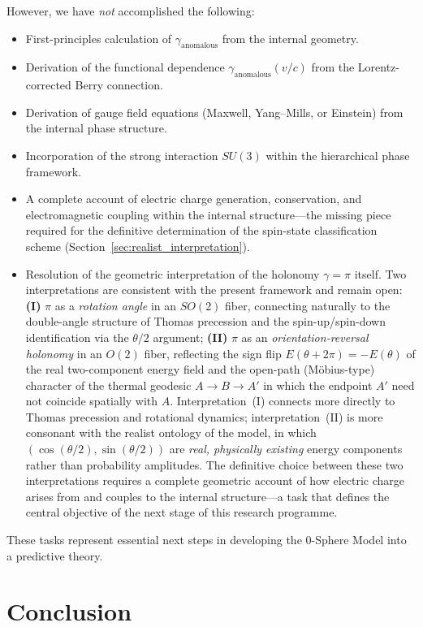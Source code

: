 \documentclass[%
 reprint,
 amsmath,amssymb,
 aps,
 prb,
]{revtex4-2}
\numberwithin{equation}{section}
\theoremstyle{definition}
\theoremstyle{remark}
\begin{document}
However, we have \emph{not} accomplished the following:
\begin{itemize}
\item First-principles calculation of $\gamma_{\text{anomalous}}$ from the internal geometry.
\item Derivation of the functional dependence $\gamma_{\text{anomalous}}(v/c)$ from the Lorentz-corrected Berry connection.
\item Derivation of gauge field equations (Maxwell, Yang--Mills, or Einstein) from the internal phase structure.
\item Incorporation of the strong interaction $SU(3)$ within the hierarchical phase framework.
\item A complete account of electric charge generation, conservation, and electromagnetic coupling within the internal structure---the missing piece required for the definitive determination of the spin-state classification scheme (Section~\ref{sec:realist_interpretation}).
\item Resolution of the geometric interpretation of the holonomy $\gamma = \pi$ itself.
Two interpretations are consistent with the present framework and remain open:
\textbf{(I)} $\pi$ as a \emph{rotation angle} in an $SO(2)$ fiber, connecting
naturally to the double-angle structure of Thomas precession and the
spin-up/spin-down identification via the $\theta/2$ argument;
\textbf{(II)} $\pi$ as an \emph{orientation-reversal holonomy} in an $O(2)$ fiber,
reflecting the sign flip $E(\theta + 2\pi) = -E(\theta)$ of the real
two-component energy field and the open-path (Möbius-type) character
of the thermal geodesic $A \to B \to A'$ in which the endpoint $A'$
need not coincide spatially with $A$.
Interpretation~(I) connects more directly to Thomas precession and
rotational dynamics; interpretation~(II) is more consonant with the
realist ontology of the model, in which $(\cos(\theta/2),\sin(\theta/2))$
are \emph{real, physically existing} energy components rather than
probability amplitudes.
The definitive choice between these two interpretations requires a
complete geometric account of how electric charge arises from and
couples to the internal structure---a task that defines the central
objective of the next stage of this research programme.
\end{itemize}

These tasks represent essential next steps in developing the 0-Sphere Model into a predictive theory.

\section{Conclusion}
\end{document}
